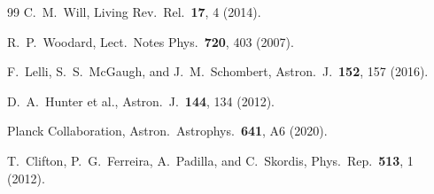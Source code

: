 \documentclass[11pt,a4paper]{article}
\begin{document}
\begin{thebibliography}{99}
  C.~M.~Will,
  Living Rev.\ Rel.\ \textbf{17}, 4 (2014).

  R.~P.~Woodard,
  Lect.\ Notes Phys.\ \textbf{720}, 403 (2007).

  F.~Lelli, S.~S.~McGaugh, and J.~M.~Schombert,
  Astron.\ J.\ \textbf{152}, 157 (2016).

  D.~A.~Hunter et al.,
  Astron.\ J.\ \textbf{144}, 134 (2012).

  Planck Collaboration,
  Astron.\ Astrophys.\ \textbf{641}, A6 (2020).

  T.~Clifton, P.~G.~Ferreira, A.~Padilla, and C.~Skordis,
  Phys.\ Rep.\ \textbf{513}, 1 (2012).

\end{thebibliography}
\end{document}
